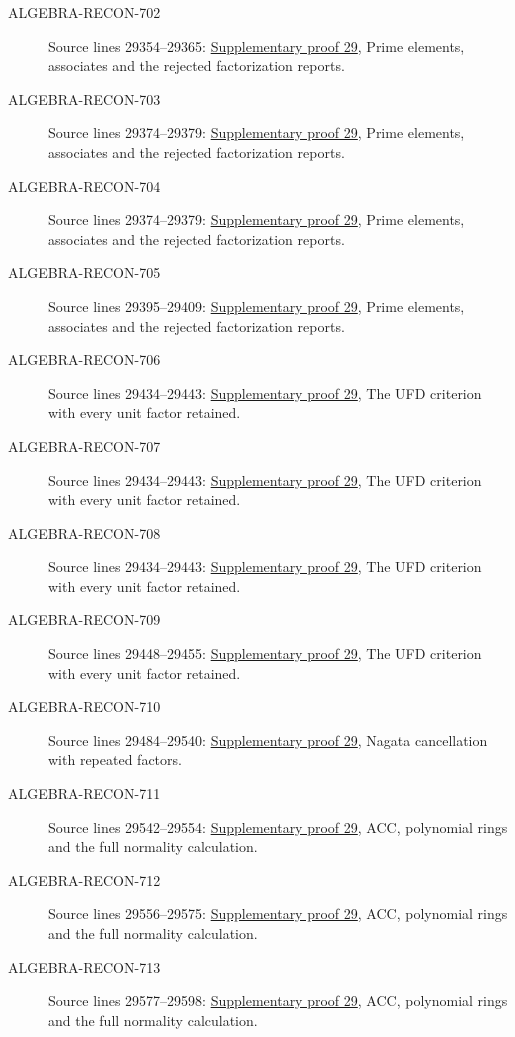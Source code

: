 \begin{description}
\item[ALGEBRA-RECON-702] Source lines 29354--29365: \hyperlink{algebra_factorization_notes_20260928}{Supplementary proof 29}, Prime elements, associates and the rejected factorization reports.
\item[ALGEBRA-RECON-703] Source lines 29374--29379: \hyperlink{algebra_factorization_notes_20260928}{Supplementary proof 29}, Prime elements, associates and the rejected factorization reports.
\item[ALGEBRA-RECON-704] Source lines 29374--29379: \hyperlink{algebra_factorization_notes_20260928}{Supplementary proof 29}, Prime elements, associates and the rejected factorization reports.
\item[ALGEBRA-RECON-705] Source lines 29395--29409: \hyperlink{algebra_factorization_notes_20260928}{Supplementary proof 29}, Prime elements, associates and the rejected factorization reports.
\item[ALGEBRA-RECON-706] Source lines 29434--29443: \hyperlink{algebra_factorization_notes_20260928}{Supplementary proof 29}, The UFD criterion with every unit factor retained.
\item[ALGEBRA-RECON-707] Source lines 29434--29443: \hyperlink{algebra_factorization_notes_20260928}{Supplementary proof 29}, The UFD criterion with every unit factor retained.
\item[ALGEBRA-RECON-708] Source lines 29434--29443: \hyperlink{algebra_factorization_notes_20260928}{Supplementary proof 29}, The UFD criterion with every unit factor retained.
\item[ALGEBRA-RECON-709] Source lines 29448--29455: \hyperlink{algebra_factorization_notes_20260928}{Supplementary proof 29}, The UFD criterion with every unit factor retained.
\item[ALGEBRA-RECON-710] Source lines 29484--29540: \hyperlink{algebra_factorization_notes_20260928}{Supplementary proof 29}, Nagata cancellation with repeated factors.
\item[ALGEBRA-RECON-711] Source lines 29542--29554: \hyperlink{algebra_factorization_notes_20260928}{Supplementary proof 29}, ACC, polynomial rings and the full normality calculation.
\item[ALGEBRA-RECON-712] Source lines 29556--29575: \hyperlink{algebra_factorization_notes_20260928}{Supplementary proof 29}, ACC, polynomial rings and the full normality calculation.
\item[ALGEBRA-RECON-713] Source lines 29577--29598: \hyperlink{algebra_factorization_notes_20260928}{Supplementary proof 29}, ACC, polynomial rings and the full normality calculation.

\end{description}

